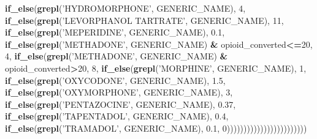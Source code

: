 \documentclass[]{article}
\newenvironment{Shaded}{\begin{snugshade}}{\end{snugshade}}
\newcommand{\KeywordTok}[1]{\textcolor[rgb]{0.13,0.29,0.53}{\textbf{#1}}}
\newcommand{\DecValTok}[1]{\textcolor[rgb]{0.00,0.00,0.81}{#1}}
\newcommand{\FloatTok}[1]{\textcolor[rgb]{0.00,0.00,0.81}{#1}}
\newcommand{\StringTok}[1]{\textcolor[rgb]{0.31,0.60,0.02}{#1}}
\newcommand{\OperatorTok}[1]{\textcolor[rgb]{0.81,0.36,0.00}{\textbf{#1}}}
\newcommand{\NormalTok}[1]{#1}
\begin{document}
\begin{Shaded}
\begin{Highlighting}[]
{{{{{{    \KeywordTok{if_else}\NormalTok{(}\KeywordTok{grepl}\NormalTok{(}\StringTok{'HYDROMORPHONE'}\NormalTok{, GENERIC_NAME), }\DecValTok{4}\NormalTok{,}
    \KeywordTok{if_else}\NormalTok{(}\KeywordTok{grepl}\NormalTok{(}\StringTok{'LEVORPHANOL TARTRATE'}\NormalTok{, GENERIC_NAME), }\DecValTok{11}\NormalTok{,}
    \KeywordTok{if_else}\NormalTok{(}\KeywordTok{grepl}\NormalTok{(}\StringTok{'MEPERIDINE'}\NormalTok{, GENERIC_NAME), }\FloatTok{0.1}\NormalTok{,}
    \KeywordTok{if_else}\NormalTok{(}\KeywordTok{grepl}\NormalTok{(}\StringTok{'METHADONE'}\NormalTok{, GENERIC_NAME) }\OperatorTok{&}\StringTok{ }\NormalTok{opioid_converted}\OperatorTok{<=}\DecValTok{20}\NormalTok{, }\DecValTok{4}\NormalTok{, }
    \KeywordTok{if_else}\NormalTok{(}\KeywordTok{grepl}\NormalTok{(}\StringTok{'METHADONE'}\NormalTok{, GENERIC_NAME) }\OperatorTok{&}\StringTok{ }\NormalTok{opioid_converted}\OperatorTok{>}\DecValTok{20}\NormalTok{, }\DecValTok{8}\NormalTok{, }
    \KeywordTok{if_else}\NormalTok{(}\KeywordTok{grepl}\NormalTok{(}\StringTok{'MORPHINE'}\NormalTok{, GENERIC_NAME), }\DecValTok{1}\NormalTok{, }
    \KeywordTok{if_else}\NormalTok{(}\KeywordTok{grepl}\NormalTok{(}\StringTok{'OXYCODONE'}\NormalTok{, GENERIC_NAME), }\FloatTok{1.5}\NormalTok{, }
    \KeywordTok{if_else}\NormalTok{(}\KeywordTok{grepl}\NormalTok{(}\StringTok{'OXYMORPHONE'}\NormalTok{, GENERIC_NAME), }\DecValTok{3}\NormalTok{,}
    \KeywordTok{if_else}\NormalTok{(}\KeywordTok{grepl}\NormalTok{(}\StringTok{'PENTAZOCINE'}\NormalTok{, GENERIC_NAME), }\FloatTok{0.37}\NormalTok{,}
    \KeywordTok{if_else}\NormalTok{(}\KeywordTok{grepl}\NormalTok{(}\StringTok{'TAPENTADOL'}\NormalTok{, GENERIC_NAME), }\FloatTok{0.4}\NormalTok{,}
    \KeywordTok{if_else}\NormalTok{(}\KeywordTok{grepl}\NormalTok{(}\StringTok{'TRAMADOL'}\NormalTok{, GENERIC_NAME), }\FloatTok{0.1}\NormalTok{, }\DecValTok{0}\NormalTok{))))))))))))))))))))))))}

}}}}}}
\end{Highlighting}
\end{Shaded}
\end{document}
